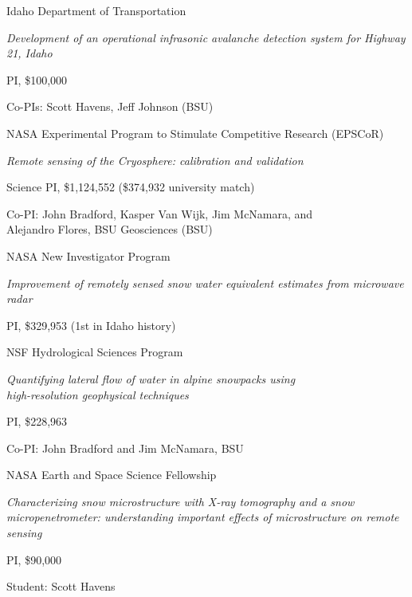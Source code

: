 \documentclass[11pt]{article}
\renewenvironment{itemize}{
  \begin{list}{}{
    \setlength{\leftmargin}{1.5em}
    \setlength{\itemsep}{0pt}
    \setlength{\parskip}{0pt}
  }
}{
  \end{list}
}
\begin{document}
\begin{itemize}
\item[09/2012-08/2015] Idaho Department of Transportation
\begin{itemize}
\item \textit{Development of an operational infrasonic avalanche detection system for Highway 21, Idaho}
\item PI, \$100,000
\item Co-PIs: Scott Havens, Jeff Johnson (BSU)
\end{itemize}

\item[01/2011-12/2013] NASA Experimental Program to Stimulate Competitive Research (EPSCoR)
\begin{itemize}
  \item \textit{Remote sensing of the Cryosphere: calibration and validation}
  \item Science PI, \$1,124,552 (\$374,932 university match)
  \item Co-PI: John Bradford, Kasper Van Wijk, Jim McNamara, and \\
        Alejandro Flores, BSU Geosciences (BSU)
\end{itemize}

\item[09/2010-08/2013] NASA New Investigator Program
\begin{itemize}
  \item \textit{Improvement of remotely sensed snow water equivalent estimates 
  from microwave radar}
  \item PI, \$329,953 (1st in Idaho history)
\end{itemize}

\item[04/2010-03/2013] NSF Hydrological Sciences Program
\begin{itemize}
  \item \textit{Quantifying lateral flow of water in alpine snowpacks using \\
  high-resolution geophysical techniques}
  \item PI, \$228,963
  \item Co-PI: John Bradford and Jim McNamara, BSU
\end{itemize}

\item[09/2010-12/2013] NASA Earth and Space Science Fellowship
\begin{itemize}
  \item \textit{Characterizing snow microstructure with X-ray tomography and a snow micropenetrometer: understanding important effects of microstructure on remote sensing}
  \item PI, \$90,000 
  \item Student: Scott Havens
\end{itemize}


\end{itemize}
\end{document}
